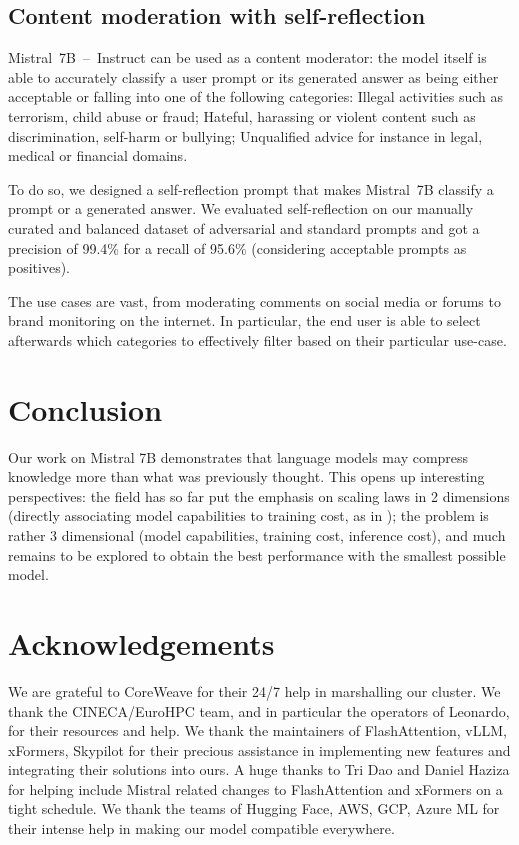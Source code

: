 \documentclass{article}
\def\mistral{Mistral~7B\xspace}
\def\mistralchat{Mistral~7B~--~Instruct\xspace}
\begin{document}
\subsection{Content moderation with self-reflection}

 \mistralchat can be used as a content moderator: the model itself is able to accurately classify a user prompt or its generated answer as being either acceptable or falling into one of the following categories:
Illegal activities such as terrorism, child abuse or fraud;
Hateful, harassing or violent content such as discrimination, self-harm or bullying;
Unqualified advice for instance in legal, medical or financial domains.

 To do so, we designed a self-reflection prompt that makes \mistral classify a prompt or a generated answer. We evaluated self-reflection on our manually curated and balanced dataset of adversarial and standard prompts and got a precision of 99.4\% for a recall of 95.6\% (considering acceptable prompts as positives).

 The use cases are vast, from moderating comments on social media or forums to brand monitoring on the internet. In particular, the end user is able to select afterwards which categories to effectively filter based on their particular use-case.

\section{Conclusion}

Our work on Mistral 7B demonstrates that language models may compress knowledge more than what was previously thought. This opens up interesting perspectives: the field has so far put the emphasis on scaling laws in 2 dimensions (directly associating model capabilities to training cost, as in \cite{hoffmann2022compute}); the problem is rather 3 dimensional (model capabilities, training cost, inference cost), and much remains to be explored to obtain the best performance with the smallest possible model.

\section*{Acknowledgements}
 We are grateful to CoreWeave for their 24/7 help in marshalling our cluster. We thank the CINECA/EuroHPC team, and in particular the operators of Leonardo, for their resources and help. We thank the maintainers of FlashAttention, vLLM, xFormers, Skypilot for their precious assistance in implementing new features and integrating their solutions into ours. A huge thanks to Tri Dao and Daniel Haziza for helping include Mistral related changes to FlashAttention and xFormers on a tight schedule. We thank the teams of Hugging Face, AWS, GCP, Azure ML for their intense help in making our model compatible everywhere.
\end{document}
